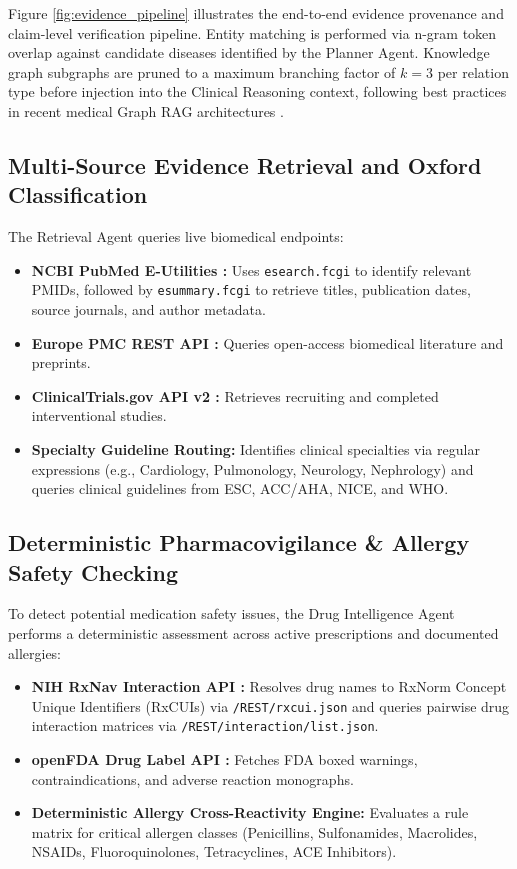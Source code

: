 \documentclass[journal,10pt,twocolumn]{IEEEtran}
\begin{document}
Figure \ref{fig:evidence_pipeline} illustrates the end-to-end evidence provenance and claim-level verification pipeline. Entity matching is performed via n-gram token overlap against candidate diseases identified by the Planner Agent. Knowledge graph subgraphs are pruned to a maximum branching factor of $k=3$ per relation type before injection into the Clinical Reasoning context, following best practices in recent medical Graph RAG architectures \cite{wu2025medical, rezaei2024agentic}.

\subsection{Multi-Source Evidence Retrieval and Oxford Classification}
The Retrieval Agent queries live biomedical endpoints:
\begin{itemize}
    \item \textbf{NCBI PubMed E-Utilities \cite{ncbi2024eutils}:} Uses \texttt{esearch.fcgi} to identify relevant PMIDs, followed by \texttt{esummary.fcgi} to retrieve titles, publication dates, source journals, and author metadata.
    \item \textbf{Europe PMC REST API \cite{europepmc2024}:} Queries open-access biomedical literature and preprints.
    \item \textbf{ClinicalTrials.gov API v2 \cite{clinicaltrials2024}:} Retrieves recruiting and completed interventional studies.
    \item \textbf{Specialty Guideline Routing:} Identifies clinical specialties via regular expressions (e.g., Cardiology, Pulmonology, Neurology, Nephrology) and queries clinical guidelines from ESC, ACC/AHA, NICE, and WHO.
\end{itemize}

\subsection{Deterministic Pharmacovigilance \& Allergy Safety Checking}
To detect potential medication safety issues, the Drug Intelligence Agent performs a deterministic assessment across active prescriptions and documented allergies:
\begin{itemize}
    \item \textbf{NIH RxNav Interaction API \cite{rxnorm2024}:} Resolves drug names to RxNorm Concept Unique Identifiers (RxCUIs) via \texttt{/REST/rxcui.json} and queries pairwise drug interaction matrices via \texttt{/REST/interaction/list.json}.
    \item \textbf{openFDA Drug Label API \cite{openfda2024}:} Fetches FDA boxed warnings, contraindications, and adverse reaction monographs.
    \item \textbf{Deterministic Allergy Cross-Reactivity Engine:} Evaluates a rule matrix for critical allergen classes (Penicillins, Sulfonamides, Macrolides, NSAIDs, Fluoroquinolones, Tetracyclines, ACE Inhibitors).
\end{itemize}
\end{document}

